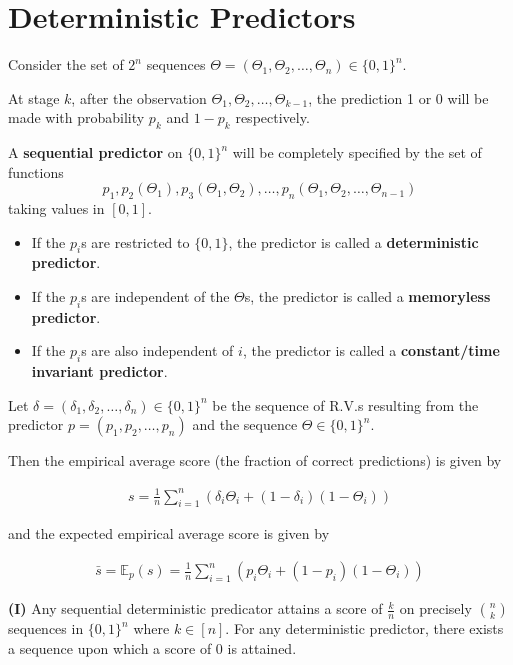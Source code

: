 \documentclass[11pt]{article}
\numberwithin{equation}{section}
\theoremstyle{boldStyle}
\begin{document}
\section{Deterministic Predictors}

Consider the set of $2^n$ sequences $\Theta = (\Theta_1, \Theta_2, \ldots, \Theta_{n}) \in \{0, 1\}^n$.

At stage $k$, after the observation $\Theta_1, \Theta_2, \ldots, \Theta_{k-1}$, the prediction 1 or 0 will be made with probability $p_k$ and $1-p_k$ respectively.

A \textbf{sequential predictor} on $\{0, 1\}^n$ will be completely specified by the set of functions 
\[
    p_1, p_2(\Theta_1), p_3(\Theta_1, \Theta_2), \ldots, p_n(\Theta_1, \Theta_2, \ldots, \Theta_{n-1})
\]
taking values in $[0, 1]$.
\begin{itemize}
    \item If the $p_i$s are restricted to $\{0, 1\}$, the predictor is called a \textbf{deterministic predictor}.
    \item If the $p_i$s are independent of the $\Theta$s, the predictor is called a \textbf{memoryless predictor}.
    \item If the $p_i$s are also independent of $i$, the predictor is called a \textbf{constant/time invariant predictor}.
\end{itemize}

Let $\delta = (\delta_1, \delta_2, \ldots, \delta_n) \in \{0, 1\}^n$ be the sequence of R.V.s resulting from the predictor $p = (p_1, p_2, \ldots, p_n)$ and the sequence $\Theta \in \{0, 1\}^n$.

Then the empirical average score (the fraction of correct predictions) is given by

\begin{align}
    s = \frac{1}{n} \sum_{i=1}^{n} ( \delta_i \Theta_i + (1 - \delta_i)(1 - \Theta_i) )
\end{align}

and the expected empirical average score is given by

\begin{align}
    \bar{s} = \mathbb{E}_{p}(s) =  \frac{1}{n} \sum_{i=1}^{n} \left( p_i \Theta_i + (1 - p_i)(1 - \Theta_i) \right) 
\end{align}

\begin{boxA}
    \textbf{(I)} Any sequential deterministic predicator attains a score of $\frac{k}{n}$ on precisely $\binom{n}{k}$ sequences in $\{0, 1\}^n$ where $k \in [n]$.
    For any deterministic predictor, there exists a sequence upon which a score of 0 is attained.
\end{boxA}
\end{document}
